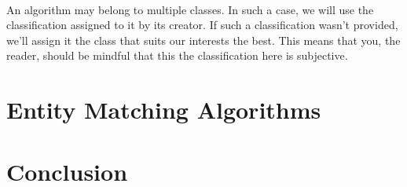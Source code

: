 \documentclass[a4paper,12pt]{article}
\begin{document}
\paragraph{}An algorithm may belong to multiple classes. In such a case,
we will use the classification assigned to it by its creator. If such a
classification wasn't provided, we'll assign it the class that suits our
interests the best. This means that you, the reader, should be mindful
that this the classification here is subjective.

\section{Entity Matching Algorithms}
\section{Conclusion}
\end{document}
